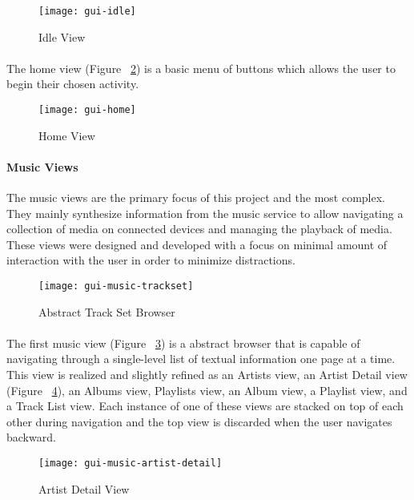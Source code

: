 \begin{figure}
  \centering
  \texttt{[image: gui-idle]}
  \caption{Idle View}
  \label{fig:gui-idle}
\end{figure}

\paragraph{}
The home view (Figure ~\ref{fig:gui-home}) is a basic menu of buttons which allows the user to begin their chosen activity.

\begin{figure}
  \centering
  \texttt{[image: gui-home]}
  \caption{Home View}
  \label{fig:gui-home}
\end{figure}

\paragraph{Music Views}
The music views are the primary focus of this project and the most complex.
They mainly synthesize information from the music service to allow navigating a collection of media on connected devices and managing the playback of media.
These views were designed and developed with a focus on minimal amount of interaction with the user in order to minimize distractions.

\begin{figure}
  \centering
  \texttt{[image: gui-music-trackset]}
  \caption{Abstract Track Set Browser}
  \label{fig:gui-music-trackset}
\end{figure}

\paragraph{}
The first music view (Figure ~\ref{fig:gui-music-trackset}) is a abstract browser that is capable of navigating through a single-level list of textual information one page at a time.
This view is realized and slightly refined as an Artists view, an Artist Detail view (Figure ~\ref{fig:gui-music-artist-detail}), an Albums view, Playlists view, an Album view, a Playlist view, and a Track List view.
Each instance of one of these views are stacked on top of each other during navigation and the top view is discarded when the user navigates backward.

\begin{figure}
  \centering
  \texttt{[image: gui-music-artist-detail]}
  \caption{Artist Detail View}
  \label{fig:gui-music-artist-detail}
\end{figure}

